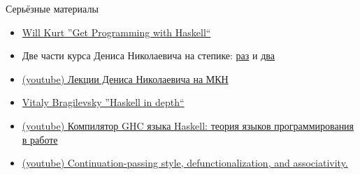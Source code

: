     \begin{frame}{Серьёзные материалы}
        \begin{itemize}
            \item \href{https://www.amazon.com/Get-Programming-Haskell-Will-Kurt/dp/1617293768}{\color{blue} Will Kurt ''Get Programming with Haskell``}
            \item Две части курса Дениса Николаевича на степике: \href{https://stepik.org/course/75/syllabus}{\color{blue} раз} и \href{https://stepik.org/course/693/syllabus}{\color{blue} два}
            \item \href{https://www.youtube.com/playlist?list=PL-_cKNuVAYAVX_q9XOKoFm95234G6YfOj}{\color{blue} (youtube) Лекции Дениса Николаевича на МКН}
            \item \href{https://www.amazon.com/Haskell-Depth-Vitaly-Bragilevsky-ebook/dp/B098C6ZFZR}{\color{blue} Vitaly Bragilevsky ''Haskell in depth``}
            \item \href{https://www.youtube.com/watch?v=DS0dgYVnHy4&list=PLvPsfYrGz3wtQeNnms4dKnqqguoEb5TPx}{\color{blue} (youtube) Компилятор GHC языка Haskell: теория языков программирования в работе}
            \item \href{https://youtu.be/8gnhaE2nmQ0?si=A8lDF9pJqa_07x9q}{\color{blue} (youtube) Continuation-passing style, defunctionalization, and associativity.}
        \end{itemize}
    \end{frame}



